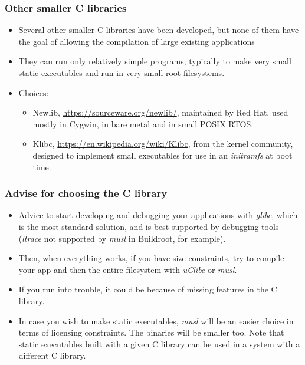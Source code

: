 \begin{frame}
  \frametitle{Other smaller C libraries}
  \begin{itemize}
  \item Several other smaller C libraries have been developed, but
    none of them have the goal of allowing the compilation of large
    existing applications
  \item They can run only relatively simple programs,
	typically to make very small static executables and run
	in very small root filesystems.
  \item Choices:
    \begin{itemize}
    \item Newlib, \url{https://sourceware.org/newlib/},
	  maintained by Red Hat, used mostly in Cygwin, in bare metal
          and in small POSIX RTOS.
    \item Klibc, \url{https://en.wikipedia.org/wiki/Klibc},
          from the kernel community, designed to implement small executables
          for use in an {\em initramfs} at boot time.
    \end{itemize}
  \end{itemize}
\end{frame}

\begin{frame}
  \frametitle{Advise for choosing the C library}
  \begin{itemize}
  \item Advice to start developing and debugging your applications with
        {\em glibc}, which is the most standard solution, and is best
        supported by debugging tools ({\em ltrace} not supported by {\em
        musl} in Buildroot, for example).
  \item Then, when everything works, if you have size constraints, try to compile
        your app and then the entire filesystem with {\em uClibc} or {\em musl}.
  \item If you run into trouble, it could be because of missing features
        in the C library.
  \item In case you wish to make static executables, {\em musl} will be
        an easier choice in terms of licensing constraints.
	The binaries will be smaller too.
        Note that static executables built with a given C library
        can be used in a system with a different C library.
  \end{itemize}
\end{frame}
